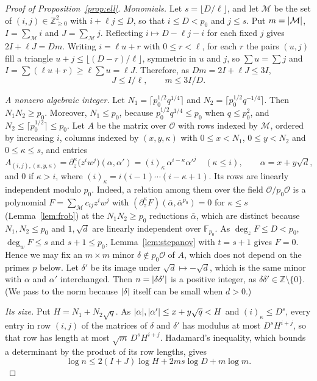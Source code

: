 \documentclass[11pt]{amsart}
\theoremstyle{remark}
\newcommand{\Z}{\mathbb{Z}}
\newcommand{\F}{\mathbb{F}}
\newcommand{\cO}{\mathcal{O}}
\newcommand{\cM}{\mathcal{M}}
\newcommand{\sd}{\sqrt{d}}
\DeclarePairedDelimiter\abs{\lvert}{\rvert}
\begin{document}
\begin{proof}[Proof of Proposition~\ref{prop:ell}]

\emph{Monomials.} Let $s=\lfloor D/\ell\rfloor$, and let $\cM$ be the set of $(i,j)\in\Z_{\ge0}^2$
with $i+\ell j\le D$, so that $i\le D<p_0$ and $j\le s$. Put $m=\abs{\cM}$, $I=\sum_\cM i$ and
$J=\sum_\cM j$. Reflecting $i\mapsto D-\ell j-i$ for each fixed $j$ gives $2I+\ell J=Dm$. Writing
$i=\ell u+r$ with $0\le r<\ell$, for each $r$ the pairs $(u,j)$ fill a triangle
$u+j\le\lfloor(D-r)/\ell\rfloor$, symmetric in $u$ and $j$, so $\sum u=\sum j$ and
$I=\sum(\ell u+r)\ge\ell\sum u=\ell J$. Therefore, as
$Dm=2I+\ell J\le3I$,
\begin{equation}\label{eq:counts}
J\le I/\ell,\qquad m\le3I/D.
\end{equation}

\emph{A nonzero algebraic integer.} Let $N_1=\lceil p_0^{1/2}q^{1/4}\rceil$ and
$N_2=\lceil p_0^{1/2}q^{-1/4}\rceil$. Then $N_1N_2\ge p_0$. Moreover, $N_1\le p_0$, because
$p_0^{1/2}q^{1/4}\le p_0$ when $q\le p_0^2$, and $N_2\le\lceil p_0^{1/2}\rceil\le p_0$. Let $A$
be the matrix over $\cO$ with rows indexed by $\cM$, ordered by increasing $i$, columns indexed by
$(x,y,\kappa)$ with $0\le x<N_1$, $0\le y<N_2$ and $0\le\kappa\le s$, and entries
\[
A_{(i,j),(x,y,\kappa)}=\partial_z^\kappa\bigl(z^iw^j\bigr)(\alpha,\alpha')
=(i)_\kappa\,\alpha^{i-\kappa}\alpha'^{j}\quad(\kappa\le i),\qquad\alpha=x+y\sd,
\]
and $0$ if $\kappa>i$, where $(i)_\kappa=i(i-1)\cdots(i-\kappa+1)$. Its rows are linearly
independent modulo $p_0$. Indeed, a relation among them over the field $\cO/p_0\cO$ is a polynomial
$F=\sum_\cM c_{ij}z^iw^j$ with $(\partial_z^\kappa F)(\bar\alpha,\bar\alpha^{p_0})=0$ for
$\kappa\le s$ (Lemma~\ref{lem:frob}) at the $N_1N_2\ge p_0$ reductions $\bar\alpha$, which are
distinct because $N_1,N_2\le p_0$ and $1,\sd$ are linearly independent over $\F_{p_0}$. As
$\deg_zF\le D<p_0$, $\deg_wF\le s$ and $s+1\le p_0$, Lemma~\ref{lem:stepanov} with $t=s+1$ gives
$F=0$. Hence we may fix an $m\times m$ minor $\delta\notin p_0\cO$ of $A$, which does not depend on the
primes $p$ below. Let $\delta'$ be its image under $\sd\mapsto-\sd$, which is the same minor with
$\alpha$ and $\alpha'$ interchanged. Then $n=\abs{\delta\delta'}$ is a positive integer, as
$\delta\delta'\in\Z\setminus\{0\}$. (We pass to the norm because $\abs{\delta}$ itself can be small when $d>0$.)

\emph{Its size.} Put $H=N_1+N_2\sqrt q$. As $\abs{\alpha},\abs{\alpha'}\le x+y\sqrt q<H$ and
$(i)_\kappa\le D^s$, every entry in row $(i,j)$ of the matrices of $\delta$ and $\delta'$ has modulus
at most $D^sH^{i+j}$, so that row has length at most $\sqrt m\,D^sH^{i+j}$. Hadamard's inequality, which
bounds a determinant by the product of its row lengths, gives
\begin{equation}\label{eq:upper}
\log n\le2(I+J)\log H+2ms\log D+m\log m.
\end{equation}


\end{proof}
\end{document}
